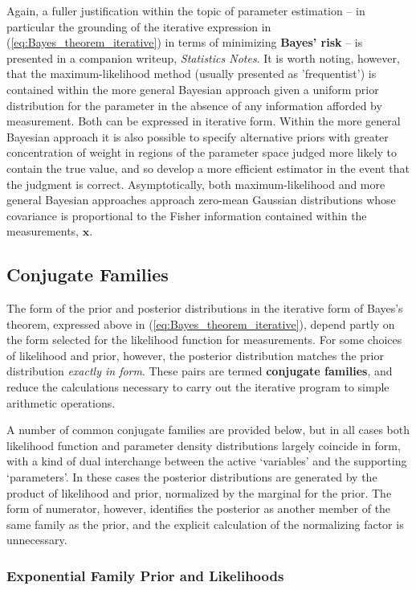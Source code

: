 \documentclass[12pt, twoside, draft]{article}
\begin{document}
Again, a fuller justification within the topic of parameter estimation -- in particular the grounding of the iterative expression in (\ref{eq:Bayes_theorem_iterative}) in terms of minimizing \textbf{Bayes' risk} -- is presented in a companion writeup, \textit{Statistics Notes}.  It is worth noting, however, that the maximum-likelihood method (usually presented as 'frequentist') is contained within the more general Bayesian approach given a uniform prior distribution for the parameter in the absence of any information afforded by measurement.  Both can be expressed in iterative form. Within the more general Bayesian approach it is also possible to specify alternative priors with greater concentration of weight in regions of the parameter space judged more likely to contain the true value, and so develop a more efficient estimator in the event that the judgment is correct.  Asymptotically, both maximum-likelihood and more general Bayesian approaches approach zero-mean Gaussian distributions whose covariance is proportional to the Fisher information contained within the measurements, $\mathbf{x}$.

\subsection{Conjugate Families}\label{sec:conjugate_families}
The form of the prior and posterior distributions in the iterative form of Bayes's theorem, expressed above in (\ref{eq:Bayes_theorem_iterative}), depend partly on the form selected for the likelihood function for measurements.  For some choices of likelihood and prior, however, the posterior distribution matches the prior distribution \textit{exactly in form}.  These pairs are termed \textbf{conjugate families}, and reduce the calculations necessary to carry out the iterative program to simple arithmetic operations.  

A number of common conjugate families are provided below, but in all cases both likelihood function and parameter density distributions largely coincide in form, with a kind of dual interchange between the active `variables' and the supporting `parameters'.  In these cases the posterior distributions are generated by the product of likelihood and prior, normalized by the marginal for the prior.  The form of numerator, however, identifies the posterior as another member of the same family as the prior, and the explicit calculation of the normalizing factor is unnecessary.

\subsubsection{Exponential Family Prior and Likelihoods}
\end{document}
